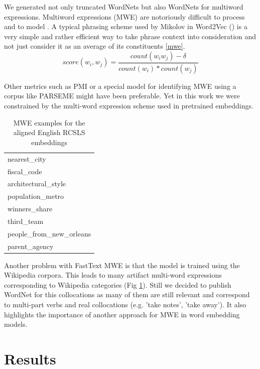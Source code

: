 \documentclass[11pt,a4paper]{article}
\begin{document}
We generated not only truncated WordNets but also WordNets for multiword expressions. Multiword expressions (MWE) are notoriously difficult to process and to model \cite{sag2002multiword}. A typical phrasing scheme used by Mikolov in Word2Vec (\citeyear{mikolov-representations-2013}) is a very simple	and rather efficient way to take phrase context into consideration and not just consider it as an average of its constituents \ref{mwe}.
$$score(w_i, w_j) = \frac{count(w_iw_j) - \delta}{count(w_i) * count(w_j)}$$

Other metrics such as PMI \cite{bouma2009normalized} or a special model for identifying MWE using a corpus like PARSEME \cite{savary2018parseme} might have been preferable. Yet in this work we were constrained by the multi-word expression scheme used in pretrained embeddings.
\begin{table}[!htbp]
	\small
	\caption{MWE examples for the aligned English RCSLS embeddings}
	\label{mwe-wiki}		
	\centering
	\begin{tabular}{|l|}
		\hline
		nearest\_city \\
		fiscal\_code \\
		architectural\_style \\
		population\_metro \\
		winners\_share \\
		third\_team \\
		people\_from\_new\_orleans \\
		parent\_agency \\
		\hline
	\end{tabular}
\end{table}

Another problem with FastText MWE is that the model is trained using the Wikipedia corpora. This leads to many artifact multi-word expressions corresponding to Wikipedia categories (Fig \ref{mwe-wiki}). Still we decided to publish WordNet for this collocations as many of them are still relevant and correspond to multi-part verbs and real collocations (e.g. 'take notes', 'take away'). It also highlights the importance of another approach for MWE in word embedding models.

\section{Results}
\end{document}

